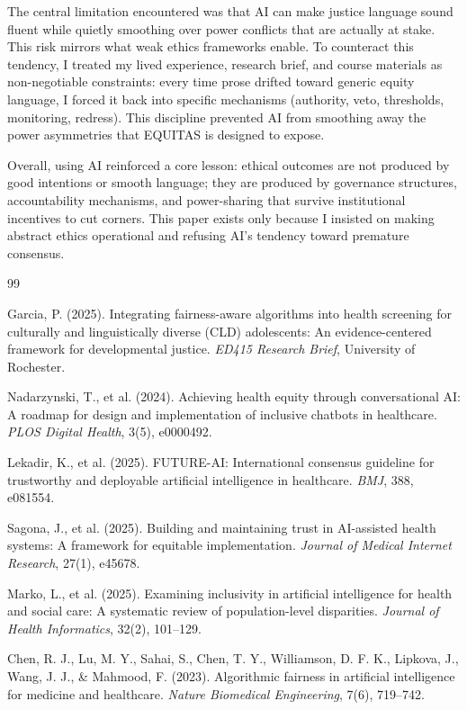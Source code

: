 \documentclass[12pt,a4paper]{article}
\begin{document}
The central limitation encountered was that AI can make justice language sound fluent while quietly smoothing over power conflicts that are actually at stake. This risk mirrors what weak ethics frameworks enable. To counteract this tendency, I treated my lived experience, research brief, and course materials as non-negotiable constraints: every time prose drifted toward generic equity language, I forced it back into specific mechanisms (authority, veto, thresholds, monitoring, redress). This discipline prevented AI from smoothing away the power asymmetries that EQUITAS is designed to expose.\cite{garcia_ed415}

Overall, using AI reinforced a core lesson: ethical outcomes are not produced by good intentions or smooth language; they are produced by governance structures, accountability mechanisms, and power-sharing that survive institutional incentives to cut corners. This paper exists only because I insisted on making abstract ethics operational and refusing AI's tendency toward premature consensus.

\begin{thebibliography}{99}

Garcia, P. (2025). Integrating fairness-aware algorithms into health screening for culturally and linguistically diverse (CLD) adolescents: An evidence-centered framework for developmental justice. \textit{ED415 Research Brief}, University of Rochester.

Nadarzynski, T., et al. (2024). Achieving health equity through conversational AI: A roadmap for design and implementation of inclusive chatbots in healthcare. \textit{PLOS Digital Health}, 3(5), e0000492.

Lekadir, K., et al. (2025). FUTURE-AI: International consensus guideline for trustworthy and deployable artificial intelligence in healthcare. \textit{BMJ}, 388, e081554.

Sagona, J., et al. (2025). Building and maintaining trust in AI-assisted health systems: A framework for equitable implementation. \textit{Journal of Medical Internet Research}, 27(1), e45678.

Marko, L., et al. (2025). Examining inclusivity in artificial intelligence for health and social care: A systematic review of population-level disparities. \textit{Journal of Health Informatics}, 32(2), 101--129.

Chen, R. J., Lu, M. Y., Sahai, S., Chen, T. Y., Williamson, D. F. K., Lipkova, J., Wang, J. J., \& Mahmood, F. (2023). Algorithmic fairness in artificial intelligence for medicine and healthcare. \textit{Nature Biomedical Engineering}, 7(6), 719--742.

\end{thebibliography}
\end{document}
